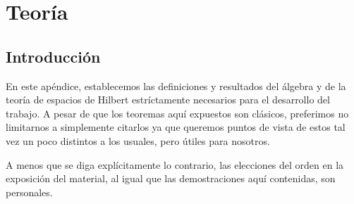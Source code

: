 \appendix 
\chapter{Teoría}


\section{Introducción}

En este apéndice, establecemos las
definiciones y resultados
del álgebra y
de la teoría de espacios de Hilbert
estríctamente
necesarios para el desarrollo del trabajo.
A pesar de que los teoremas aquí expuestos son
clásicos, preferimos no limitarnos a simplemente citarlos
ya que queremos puntos de vista de estos tal vez
un poco distintos a los usuales, pero útiles para nosotros.

A menos que se
diga explícitamente lo contrario,
las elecciones del
orden en la exposición del material, 
al igual que las demostraciones
aquí contenidas, son personales. 










